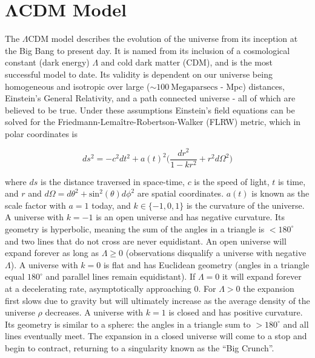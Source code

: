 \section[$\Lambda$CDM Model][$\Lambda$ CDM Model]{$\boldsymbol{\Lambda}$CDM Model}
\label{sec:dark_matter_lambda_cdm}
The $\Lambda \mathrm{CDM}$ model describes the evolution of the universe from its inception at the Big Bang to present day.  It is named
from its inclusion of a cosmological constant (dark energy) $\Lambda$ and cold dark matter (CDM), and is the most successful model to
date.  Its validity is dependent on our universe being homogeneous and isotropic over large (${\sim} 100\ \mathrm{Megaparsecs}$ - Mpc)
distances,
Einstein's General Relativity, and a path connected universe - all of which are believed to be true.  Under these assumptions Einstein's
field equations can be solved for the Friedmann-Lema\^{i}tre-Robertson-Walker (FLRW) metric, which in polar coordinates is

\begin{equation}
ds^{2} = -c^{2}dt^{2} + a(t)^{2} \bigg( \frac{dr^{2}}{1 - kr^{2}} + r^{2}d\Omega^{2} \bigg)
\label{eq:dark_matter_lambda_cdm_rw_metric}
\end{equation}

\noindent where $ds$ is the distance traversed in space-time, $c$ is the speed of light, $t$ is time, and $r$ and
$d\Omega = d\theta^2 + \mathrm{sin}^2(\theta)d\phi^2$ are spatial coordinates.  $a(t)$ is known as the scale factor with $a=1$ today, and
$k \in \{-1, 0, 1\}$ is the curvature of the
universe.  A universe with $k = -1$ is an open universe and has negative curvature.  Its geometry is hyperbolic, meaning the
sum of the angles in a triangle is $< 180^{\circ}$ and two lines that do not cross are never equidistant.  An open universe will expand
forever as long as $\Lambda \geq 0$ (observations disqualify a universe with negative $\Lambda$).  A universe with $k = 0$ is flat and
has Euclidean geometry (angles in a triangle equal $180^{\circ}$ and parallel lines remain equidistant).  If $\Lambda = 0$ it will
expand forever at a decelerating rate, asymptotically approaching 0.  For $\Lambda > 0$ the expansion first slows due to gravity but will
ultimately increase as the average density of the universe $\rho$ decreases.  A universe with $k = 1$ is closed and has positive
curvature.  Its geometry is similar to a sphere: the angles in
a triangle sum to $> 180^{\circ}$ and all lines eventually meet.  The expansion in a closed universe will come to a stop and begin to
contract, returning to a singularity known as the ``Big Crunch''.

